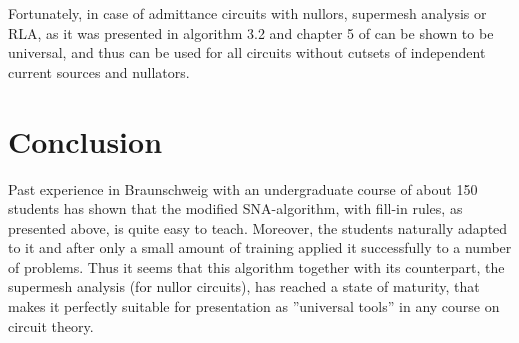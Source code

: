 \documentclass[10pt,journal,twocolumn,pagenumbers]{IEEEtran}
\begin{document}
 Fortunately, in case of admittance circuits with nullors, supermesh analysis or RLA, as it was presented in algorithm 3.2 and chapter 5 of \cite{SommerSuper} can be shown to be universal, and thus can be used for all circuits without cutsets of independent current sources and nullators.




\section{Conclusion}
Past experience in Braunschweig with an undergraduate course of about 150 students \cite{GerbrachtVL} has shown that the modified SNA-algorithm, with fill-in rules, as presented above, is quite easy to teach. Moreover, the students naturally adapted to it and after only a small amount of training applied it successfully to a number of problems. Thus it seems that this algorithm together with its counterpart, the supermesh analysis (for nullor circuits), has reached a state of maturity, that makes it perfectly suitable for presentation as ''universal tools'' in any course on circuit theory.
\end{document}
